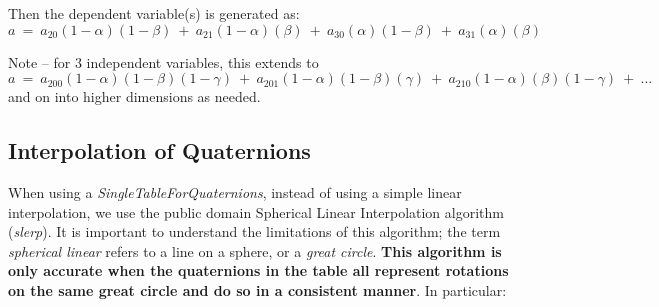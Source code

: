\documentclass[11pt,fleqn]{report}
\begin{document}
Then the dependent variable(s) is generated as:
\begin{equation}
 a ~=~ a_{20}(1-\alpha)(1-\beta) ~+~ a_{21}(1-\alpha)(\beta)
  ~+~ a_{30}(\alpha)(1-\beta) ~+~ a_{31}(\alpha)(\beta)
\end{equation}

Note – for 3 independent variables, this extends to
\begin{equation}\label{eq:3d_interp}
 a ~=~ a_{200}(1-\alpha)(1-\beta)(1-\gamma) ~+~ a_{201}(1-\alpha)(1-\beta)
(\gamma) ~+~ a_{210}(1-\alpha)(\beta)(1-\gamma) ~+~ ...
\end{equation}
and on into higher dimensions as needed.

\subsection{Interpolation of Quaternions} \label{sec:Math_slerp}
When using a \textit{SingleTableForQuaternions}, instead of using a simple
linear interpolation, we use the public domain Spherical Linear Interpolation
algorithm (\textit{slerp}). It is important to understand the limitations of
this algorithm; the term \textit{spherical linear} refers to a line on a
sphere, or a \textit{great circle}.  \textbf{This algorithm is only accurate
when the quaternions in the table all represent rotations on the same great
circle and do so in a consistent manner}.  In particular:
\end{document}
